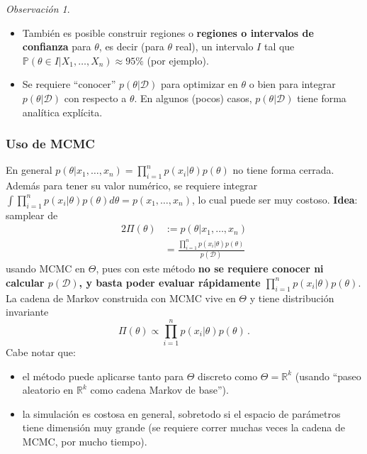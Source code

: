 \documentclass[letterpaper,11pt]{article} %
\theoremstyle{defbreak}
\newtheorem{example}{Ejemplo}[subsection]
\theoremstyle{propbreak}
\theoremstyle{remark}
\newtheorem{remark}{Observación}[subsection]
\theoremstyle{break}
\def\R{\mathbb{R}}
\def\P{\mathbb{P}}
\def\beforeitemize{\leavevmode \vspace{-0.5\baselineskip}}
\begin{document}
\begin{remark}
\beforeitemize
\begin{itemize}
    \item También es posible construir regiones o \textbf{regiones o intervalos de confianza} para $\theta$, es decir (para $\theta$ real), un intervalo $I$ tal que $\P(\theta\in I | X_1,\dots,X_n)\approx 95\%$ (por ejemplo).
    \item Se requiere ``conocer'' $p(\theta|\mathcal{D})$ para optimizar en $\theta$ o bien para integrar $p(\theta|\mathcal{D})$ con respecto a $\theta$. En algunos (pocos) casos, $p(\theta|\mathcal{D})$ tiene forma analítica explícita.
\end{itemize}
\end{remark}
\subsubsection{Uso de MCMC}
En general $p(\theta|x_1,\dots,x_n)=\displaystyle \prod^n_{i=1}p(x_i|\theta)p(\theta)$ no tiene forma cerrada.
\newline Además para tener su valor numérico, se requiere integrar $\int\prod^n_{i=1}p(x_i|\theta)p(\theta)d\theta=p(x_1,\dots,x_n)$, lo cual puede ser muy costoso.
\newp \textbf{Idea}: samplear de
\begin{alignat*}{2}
    \Pi(\theta) & := p(\theta|x_1,\dots,x_n)\\
     & = \displaystyle \frac{\prod^n_{i=1}p(x_i|\theta)p(\theta)}{p(\mathcal{D})}\,
\end{alignat*}
usando MCMC en $\Theta$, pues con este m\'etodo \textbf{no se requiere conocer ni calcular $p(\mathcal{D})$, y 
basta poder evaluar rápidamente $\prod^n_{i=1}p(x_i|\theta)p(\theta)$}. La cadena de Markov construida con MCMC vive en $\Theta$ y tiene distribución invariante $$\Pi(\theta)\propto\displaystyle\prod^n_{i=1}p(x_i|\theta)p(\theta)\,.$$  
Cabe notar que: 
\begin{itemize}
    \item el m\'etodo puede aplicarse tanto para $\Theta$ discreto como $\Theta=\R^k$ (usando ``paseo aleatorio en $\R^k$ como cadena Markov de base''). %
    \item la simulación es costosa en general, sobretodo si el espacio de parámetros tiene dimensión muy grande (se requiere correr muchas veces la cadena de MCMC, por mucho tiempo).
\end{itemize}
\end{document}
